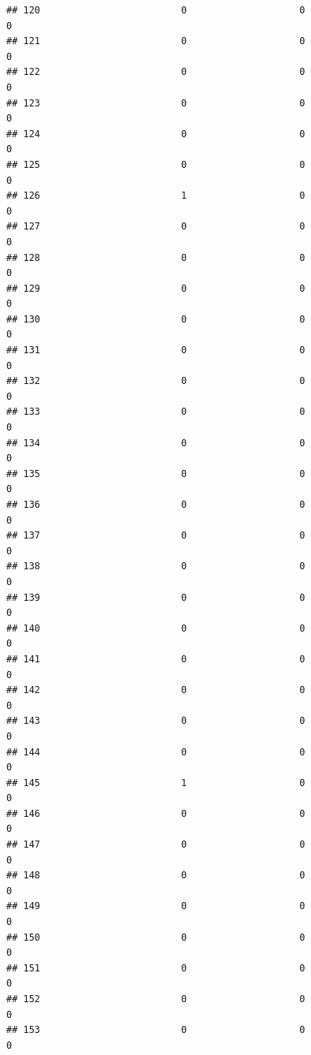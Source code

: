 \documentclass[
]{article}
\begin{document}
\begin{verbatim}
## 120                         0                    0                      0
## 121                         0                    0                      0
## 122                         0                    0                      0
## 123                         0                    0                      0
## 124                         0                    0                      0
## 125                         0                    0                      0
## 126                         1                    0                      0
## 127                         0                    0                      0
## 128                         0                    0                      0
## 129                         0                    0                      0
## 130                         0                    0                      0
## 131                         0                    0                      0
## 132                         0                    0                      0
## 133                         0                    0                      0
## 134                         0                    0                      0
## 135                         0                    0                      0
## 136                         0                    0                      0
## 137                         0                    0                      0
## 138                         0                    0                      0
## 139                         0                    0                      0
## 140                         0                    0                      0
## 141                         0                    0                      0
## 142                         0                    0                      0
## 143                         0                    0                      0
## 144                         0                    0                      0
## 145                         1                    0                      0
## 146                         0                    0                      0
## 147                         0                    0                      0
## 148                         0                    0                      0
## 149                         0                    0                      0
## 150                         0                    0                      0
## 151                         0                    0                      0
## 152                         0                    0                      0
## 153                         0                    0                      0

\end{verbatim}
\end{document}
